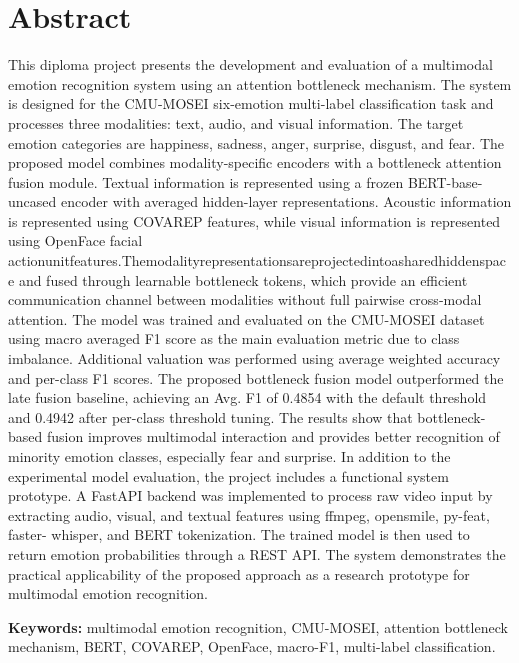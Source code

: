 %
%

\chapter{Abstract}
\begin{SingleSpace}
This diploma project presents the development and evaluation of a multimodal emotion recognition system using an attention bottleneck mechanism. The system is designed for the CMU-MOSEI six-emotion multi-label classification task and processes three modalities: text, audio, and visual information. The target emotion categories are happiness, sadness, anger, surprise, disgust, and fear.
The proposed model combines modality-specific encoders with a bottleneck attention fusion module. Textual information is represented using a frozen BERT-base-uncased encoder with averaged hidden-layer representations. Acoustic information is represented using COVAREP features, while visual information is represented using OpenFace facial actionunitfeatures.Themodalityrepresentationsareprojectedintoasharedhiddenspace and fused through learnable bottleneck tokens, which provide an efficient communication channel between modalities without full pairwise cross-modal attention.
The model was trained and evaluated on the CMU-MOSEI dataset using macro averaged F1 score as the main evaluation metric due to class imbalance. Additional valuation was performed using average weighted accuracy and per-class F1 scores. The proposed bottleneck fusion model outperformed the late fusion baseline, achieving an Avg. F1 of 0.4854 with the default threshold and 0.4942 after per-class threshold tuning. The results show that bottleneck-based fusion improves multimodal interaction and provides better recognition of minority emotion classes, especially fear and surprise.
In addition to the experimental model evaluation, the project includes a functional system prototype. A FastAPI backend was implemented to process raw video input by extracting audio, visual, and textual features using ffmpeg, opensmile, py-feat, faster- whisper, and BERT tokenization. The trained model is then used to return emotion probabilities through a REST API. The system demonstrates the practical applicability of the proposed approach as a research prototype for multimodal emotion recognition.

\textbf{Keywords:} multimodal emotion recognition, CMU-MOSEI, attention bottleneck
mechanism, BERT, COVAREP, OpenFace, macro-F1, multi-label classification.

\end{SingleSpace}
